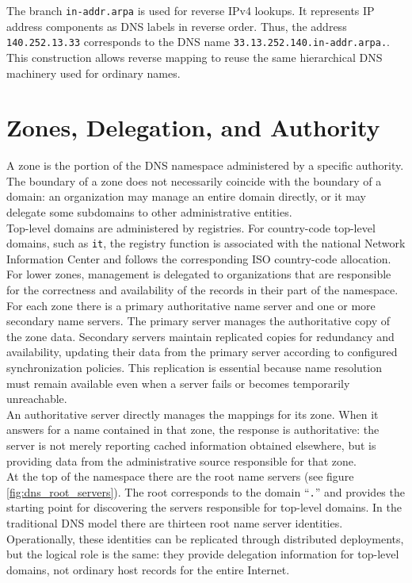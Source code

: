 \documentclass{scrbook}
\begin{document}
	The branch \texttt{in-addr.arpa} is used for reverse IPv4 lookups. It represents IP address components as DNS labels in reverse order. Thus, the address \texttt{140.252.13.33} corresponds to the DNS name \texttt{33.13.252.140.in-addr.arpa.}. This construction allows reverse mapping to reuse the same hierarchical DNS machinery used for ordinary names.
	
	\section{Zones, Delegation, and Authority}
	
	A zone is the portion of the DNS namespace administered by a specific authority. The boundary of a zone does not necessarily coincide with the boundary of a domain: an organization may manage an entire domain directly, or it may delegate some subdomains to other administrative entities.\\
	
	Top-level domains are administered by registries. For country-code top-level domains, such as \texttt{it}, the registry function is associated with the national Network Information Center and follows the corresponding ISO country-code allocation. For lower zones, management is delegated to organizations that are responsible for the correctness and availability of the records in their part of the namespace.\\
	
	For each zone there is a primary authoritative name server and one or more secondary name servers. The primary server manages the authoritative copy of the zone data. Secondary servers maintain replicated copies for redundancy and availability, updating their data from the primary server according to configured synchronization policies. This replication is essential because name resolution must remain available even when a server fails or becomes temporarily unreachable.\\
	
	An authoritative server directly manages the mappings for its zone. When it answers for a name contained in that zone, the response is authoritative: the server is not merely reporting cached information obtained elsewhere, but is providing data from the administrative source responsible for that zone.\\
	
	At the top of the namespace there are the root name servers (see figure \ref{fig:dns_root_servers}). The root corresponds to the domain ``\texttt{.}'' and provides the starting point for discovering the servers responsible for top-level domains. In the traditional DNS model there are thirteen root name server identities. Operationally, these identities can be replicated through distributed deployments, but the logical role is the same: they provide delegation information for top-level domains, not ordinary host records for the entire Internet.\\
	
\end{document}
